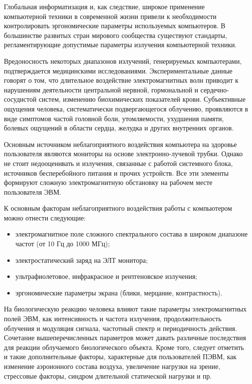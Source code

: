 Глобальная информатизация и, как следствие, широкое применение компьютерной техники в современной жизни привели к необходимости контролировать эргономические параметры используемых компьютеров.
В большинстве развитых стран мирового сообщества существуют стандарты, регламентирующие допустимые параметры излучения компьютерной техники.

Вредоносность некоторых диапазонов излучений, генерируемых компьютерами, подтверждается медицинскими исследованиями.
Экспериментальные данные говорят о том, что длительное воздействие электромагнитных волн приводит к нарушениям деятельности центральной нервной, гормональной и сердечно-сосудистой систем, изменению биохимических показателей крови.
Субъективные ощущения человека, систематически подвергающегося облучению, проявляются в виде симптомов частой головной боли, утомляемости, ухудшения памяти, болевых ощущений в области сердца, желудка и других внутренних органов.

Основным источником неблагоприятного воздействия компьютера на здоровье пользователя являются мониторы на основе электронно-лучевой трубки.
Однако не стоит недооценивать и излучения, связанные с работой системного блока, источников бесперебойного питания и прочих устройств.
Все эти элементы формируют сложную электромагнитную обстановку на рабочем месте пользователя ЭВМ.

К основным факторам неблагоприятного воздействия работы с компьютером можно отнести следующие:
\begin{itemize}
  \item электромагнитное поле сложного спектрального состава в широком диапазоне частот (от 10 Гц до 1000 МГц);
  \item электростатический заряд на ЭЛТ монитора;
  \item ультрафиолетовое, инфракрасное и рентгеновское излучения;
  \item эргономические параметры экрана (блики, мерцание, контрастность).
\end{itemize}

На биологическую реакцию человека влияют такие параметры электромагнитных полей ЭВМ, как интенсивность и частота излучения, продолжительность облучения и модуляция сигнала, частотный спектр и периодичность действия.
Сочетание вышеперечисленных параметров может давать различные последствия для реакции облучаемого биологического объекта.
Кроме того, следует отметить и такие дополнительные факторы, характерные для пользователей ПЭВМ, как изменение аэроионного состава воздуха, увеличение нагрузки на зрение, стрессовые факторы, синдром длительной статической нагрузки и пр.

